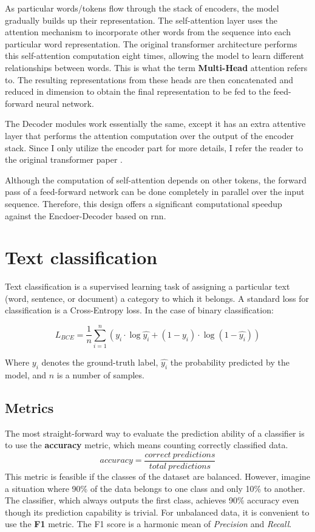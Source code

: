 As particular words/tokens flow through the stack of encoders, the model gradually builds up their representation. The self-attention layer uses the attention mechanism to incorporate other words from the sequence into each particular word representation. The original transformer architecture performs this self-attention computation eight times, allowing the model to learn different relationships between words. This is what the term \textbf{Multi-Head} attention refers to. The resulting representations from these heads are then concatenated and reduced in dimension to obtain the final representation to be fed to the feed-forward neural network. 

The Decoder modules work essentially the same, except it has an extra attentive layer that performs the attention computation over the output of the encoder stack. Since I only utilize the encoder part for more details, I refer the reader to the original transformer paper \cite{vaswani2017attention}.

Although the computation of self-attention depends on other tokens, the forward pass of a feed-forward network can be done completely in parallel over the input sequence. Therefore, this design offers a significant computational speedup against the Encdoer-Decoder based on \gls{rnn}.




\section{Text classification}
Text classification is a supervised learning task of assigning a particular text (word, sentence, or document) a category to which it belongs. A standard loss for classification is a Cross-Entropy loss. In the case of binary classification:

\begin{equation}
    L_{BCE} = \frac{1}{n} \sum_{i=1}^n ( y_i \cdot \log\hat{y_i} + (1-y_i)\cdot\log(1-\hat{y_i}))
\end{equation}

Where $y_i$ denotes the ground-truth label, $\hat{y_i}$ the probability predicted by the model, and $n$ is a number of samples.


    
\subsection{Metrics}
The most straight-forward way to evaluate the prediction ability of a classifier is to use the \textbf{accuracy} metric, which means counting correctly classified data. 
\begin{equation}
    accuracy = \frac{correct\ predictions}{total\ predictions}
\end{equation}
This metric is feasible if the classes of the dataset are balanced. However, imagine a situation where 90\% of the data belongs to one class and only 10\% to another. The classifier, which always outputs the first class, achieves 90\% accuracy even though its prediction capability is trivial. For unbalanced data, it is convenient to use the \textbf{F1} metric. The F1 score is a harmonic mean of \textit{Precision} and \textit{Recall}.

